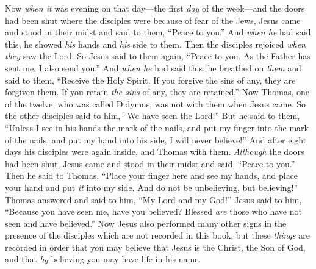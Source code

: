 \begin{biblechapter}
 Now \textit{when it} was evening on that day—the first \textit{day} of the week—and the doors had been shut where the disciples were because of fear of the Jews, Jesus came and stood in their midst and said to them, “Peace to you.”
\verse And \textit{when he} had said this, he showed \textit{his} hands and \textit{his} side to them. Then the disciples rejoiced \textit{when they} saw the Lord.
\verse So Jesus said to them again, “Peace to you. As the Father has sent me, I also send you.”
\verse And \textit{when he} had said this, he breathed on \textit{them} and said to them, “Receive the Holy Spirit.
\verse If you forgive the sins of any, they are forgiven them. If you retain \textit{the sins} of any, they are retained.”
 Now Thomas, one of the twelve, who was called Didymus, was not with them when Jesus came.
\verse So the other disciples said to him, “We have seen the Lord!” But he said to them, “Unless I see in his hands the mark of the nails, and put my finger into the mark of the nails, and put my hand into his side, I will never believe!”
\verse And after eight days his disciples were again inside, and Thomas with them. \textit{Although} the doors had been shut, Jesus came and stood in their midst and said, “Peace to you.”
\verse Then he said to Thomas, “Place your finger here and see my hands, and place your hand and put \textit{it} into my side. And do not be unbelieving, but believing!”
\verse Thomas answered and said to him, “My Lord and my God!”
\verse Jesus said to him, “Because you have seen me, have you believed? Blessed \textit{are} those who have not seen and have believed.”
 Now Jesus also performed many other signs in the presence of the disciples which are not recorded in this book,
\verse but these \textit{things} are recorded in order that you may believe that Jesus is the Christ, the Son of God, and that \textit{by} believing you may have life in his name.
\end{biblechapter}

